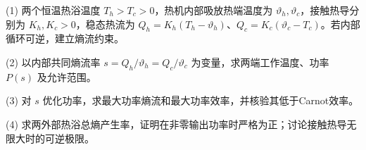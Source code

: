 (1) 两个恒温热浴温度 \(T_h>T_c>0\)，热机内部吸放热端温度为 \(\vartheta_h,\vartheta_c\)，接触热导分别为 \(K_h,K_c>0\)，稳态热流为 \(Q_h=K_h(T_h-\vartheta_h)\)、\(Q_c=K_c(\vartheta_c-T_c)\)。若内部循环可逆，建立熵流约束。

(2) 以内部共同熵流率 \(s=Q_h/\vartheta_h=Q_c/\vartheta_c\) 为变量，求两端工作温度、功率 \(P(s)\) 及允许范围。

(3) 对 \(s\) 优化功率，求最大功率熵流和最大功率效率，并核验其低于Carnot效率。

(4) 求两外部热浴总熵产生率，证明在非零输出功率时严格为正；讨论接触热导无限大时的可逆极限。
